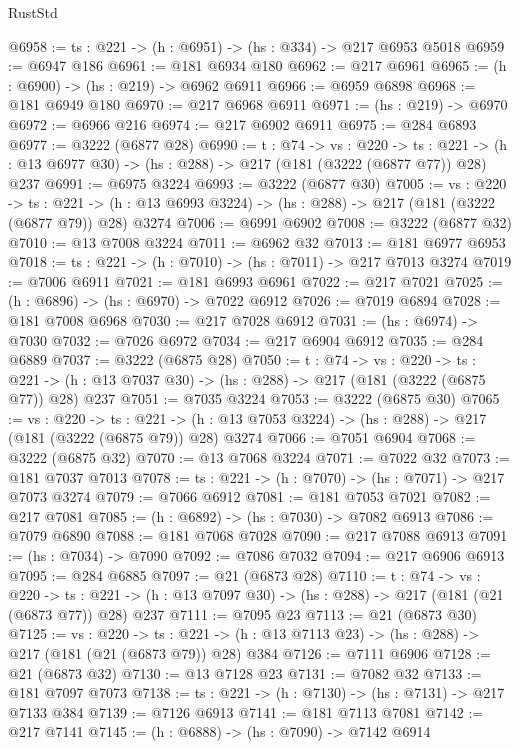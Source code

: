 \begin{lexlean}{RustStd}
\begin{coremodule}
@6958 := {ts : @221} -> (h : @6951) -> (hs : @334) -> @217 @6953 @5018
@6959 := @6947 @186
@6961 := @181 @6934 @180
@6962 := @217 @6961
@6965 := (h : @6900) -> (hs : @219) -> @6962 @6911
@6966 := @6959 @6898
@6968 := @181 @6949 @180
@6970 := @217 @6968 @6911
@6971 := (hs : @219) -> @6970
@6972 := @6966 @216
@6974 := @217 @6902 @6911
@6975 := @284 @6893
@6977 := @3222 (@6877 @28)
@6990 := {t : @74} ->
  {vs : @220} ->
  {ts : @221} -> (h : @13 @6977 @30) -> (hs : @288) -> @217 (@181 (@3222 (@6877 @77)) @28) @237
@6991 := @6975 @3224
@6993 := @3222 (@6877 @30)
@7005 := {vs : @220} ->
  {ts : @221} -> (h : @13 @6993 @3224) -> (hs : @288) -> @217 (@181 (@3222 (@6877 @79)) @28) @3274
@7006 := @6991 @6902
@7008 := @3222 (@6877 @32)
@7010 := @13 @7008 @3224
@7011 := @6962 @32
@7013 := @181 @6977 @6953
@7018 := {ts : @221} -> (h : @7010) -> (hs : @7011) -> @217 @7013 @3274
@7019 := @7006 @6911
@7021 := @181 @6993 @6961
@7022 := @217 @7021
@7025 := (h : @6896) -> (hs : @6970) -> @7022 @6912
@7026 := @7019 @6894
@7028 := @181 @7008 @6968
@7030 := @217 @7028 @6912
@7031 := (hs : @6974) -> @7030
@7032 := @7026 @6972
@7034 := @217 @6904 @6912
@7035 := @284 @6889
@7037 := @3222 (@6875 @28)
@7050 := {t : @74} ->
  {vs : @220} ->
  {ts : @221} -> (h : @13 @7037 @30) -> (hs : @288) -> @217 (@181 (@3222 (@6875 @77)) @28) @237
@7051 := @7035 @3224
@7053 := @3222 (@6875 @30)
@7065 := {vs : @220} ->
  {ts : @221} -> (h : @13 @7053 @3224) -> (hs : @288) -> @217 (@181 (@3222 (@6875 @79)) @28) @3274
@7066 := @7051 @6904
@7068 := @3222 (@6875 @32)
@7070 := @13 @7068 @3224
@7071 := @7022 @32
@7073 := @181 @7037 @7013
@7078 := {ts : @221} -> (h : @7070) -> (hs : @7071) -> @217 @7073 @3274
@7079 := @7066 @6912
@7081 := @181 @7053 @7021
@7082 := @217 @7081
@7085 := (h : @6892) -> (hs : @7030) -> @7082 @6913
@7086 := @7079 @6890
@7088 := @181 @7068 @7028
@7090 := @217 @7088 @6913
@7091 := (hs : @7034) -> @7090
@7092 := @7086 @7032
@7094 := @217 @6906 @6913
@7095 := @284 @6885
@7097 := @21 (@6873 @28)
@7110 := {t : @74} ->
  {vs : @220} ->
  {ts : @221} -> (h : @13 @7097 @30) -> (hs : @288) -> @217 (@181 (@21 (@6873 @77)) @28) @237
@7111 := @7095 @23
@7113 := @21 (@6873 @30)
@7125 := {vs : @220} ->
  {ts : @221} -> (h : @13 @7113 @23) -> (hs : @288) -> @217 (@181 (@21 (@6873 @79)) @28) @384
@7126 := @7111 @6906
@7128 := @21 (@6873 @32)
@7130 := @13 @7128 @23
@7131 := @7082 @32
@7133 := @181 @7097 @7073
@7138 := {ts : @221} -> (h : @7130) -> (hs : @7131) -> @217 @7133 @384
@7139 := @7126 @6913
@7141 := @181 @7113 @7081
@7142 := @217 @7141
@7145 := (h : @6888) -> (hs : @7090) -> @7142 @6914

\end{coremodule}
\end{lexlean}
